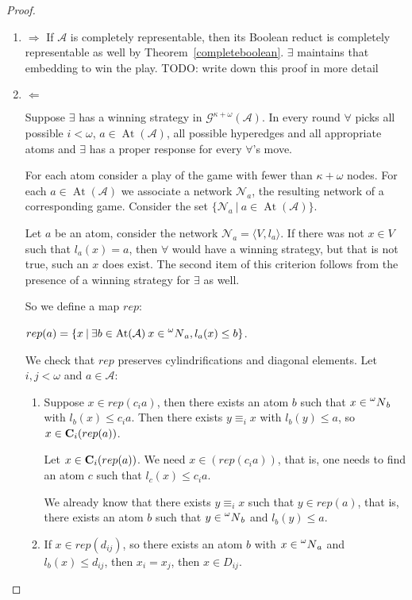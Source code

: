 \documentclass[a4paper]{article}
\theoremstyle{defin}
\theoremstyle{theorem}
\theoremstyle{prop}
\theoremstyle{lemma}
\theoremstyle{fact}
\theoremstyle{ex}
\theoremstyle{col}
\begin{document}
\begin{proof}
  $ $

  \begin{enumerate}
    \item $\Rightarrow$
    If $\mathcal{A}$ is completely representable, then its Boolean reduct is completely representable as well by Theorem~\ref{completeboolean}. $\exists$ maintains that embedding to win the play. TODO: write down this proof in more detail

    \item $\Leftarrow$

    Suppose $\exists$ has a winning strategy in $\mathcal{G}^{\kappa + \omega}(\mathcal{A})$.
    In every round $\forall$ picks all possible $i < \omega$, $a \in \operatorname{At}(\mathcal{A})$, all possible hyperedges and all appropriate atoms and $\exists$ has a proper response for every $\forall$'s move.

    For each atom consider a play of the game with fewer than $\kappa + \omega$ nodes. For each $a \in \operatorname{At}(\mathcal{A})$ we associate a network $\mathcal{N}_a$, the resulting network of a corresponding game. Consider the set $\{ \mathcal{N}_a \: | \: a \in \operatorname{At}(\mathcal{A}) \}$.

    Let $a$ be an atom, consider the network $\mathcal{N}_a = \langle V, l_a \rangle$. If there was not $x \in V$ such that $l_a(x) = a$, then $\forall$ would have a winning strategy, but that is not true, such an $x$ does exist. The second item of this criterion follows from the presence of a winning strategy for $\exists$ as well.

    So we define a map $rep$:
    \begin{center}
    $rep(a) = \{ x \: | \: \exists b \in \operatorname{At}(\mathcal{A}) \: x \in \prescript{\omega}{}N_a, l_a(x) \leq b \}$.
  \end{center}
    We check that $rep$ preserves cylindrifications and diagonal elements. Let $i, j < \omega$ and $a \in \mathcal{A}$:
    \begin{enumerate}
    \item Suppose $x \in rep(c_i a)$, then there exists an atom $b$ such that $x \in \prescript{\omega}{}N_b$ with $l_b(x) \leq c_i a$. Then there exists $y \equiv_i x$ with $l_b(y) \leq a$, so $x \in {\bf C}_i(rep(a))$.

    Let $x \in {\bf C}_i(rep(a))$. We need $x \in (rep(c_i a))$, that is, one needs to find an atom $c$ such that $l_c(x) \leq c_i a$.

    We already know that there exists $y \equiv_i x$ such that $y \in rep(a)$, that is, there exists an atom $b$ such that $y \in \prescript{\omega}{}N_b$ and $l_b(y) \leq a$.

    \item If $x \in rep(d_{ij})$, so there exists an atom $b$ with $x \in \prescript{\omega}{}N_a$ and $l_b(x) \leq d_{ij}$, then $x_i = x_j$, then $x \in D_{ij}$.
    \end{enumerate}
  \end{enumerate}
\end{proof}
\end{document}
